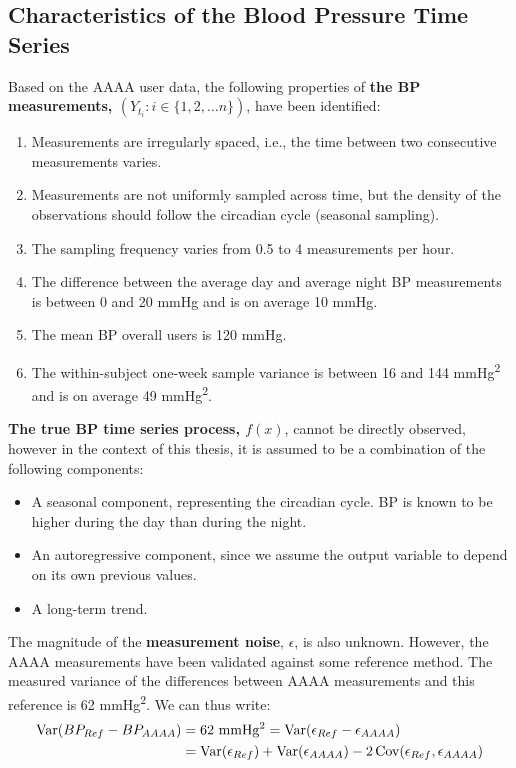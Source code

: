 \subsection{Characteristics of the Blood Pressure Time Series}\label{sec:characteristics-of-the-blood-pressure-time-series}

Based on the AAAA user data, the following properties of \textbf{the BP
measurements, $(Y_{t_i}: i \in \{1, 2, \dots n\})$}, have been identified:

\begin{enumerate}
    \item Measurements are irregularly spaced, i.e., the time between two
    consecutive measurements varies.
    \item Measurements are not uniformly sampled across time, but the density of
    the observations should follow the circadian cycle (seasonal sampling).
    \item The sampling frequency varies from 0.5 to 4 measurements per hour.
    \item The difference between the average day and average night BP measurements
    is between 0 and 20 mmHg and is on average 10 mmHg.
    \item The mean BP overall users is 120 mmHg.
    \item The within-subject one-week sample variance is between 16 and 144
    mmHg\textsuperscript{2} and is on average 49 mmHg\textsuperscript{2}.
\end{enumerate}


\textbf{The true BP time series process, $f(x)$}, cannot be directly observed,
however in the context of this thesis, it
is assumed to be a combination of the following components:

\begin{itemize}
    \item A seasonal component, representing the circadian cycle. BP is known to
    be higher during the day than during the night.
    \item An autoregressive component, since we assume the output variable to
    depend on its own previous values.
    \item A long-term trend.
\end{itemize}


The magnitude of the \textbf{measurement noise}, $\epsilon$, is also unknown.
However, the AAAA measurements have been validated against some
reference method.
The measured variance of the differences between AAAA measurements
and this reference is 62 mmHg\textsuperscript{2}.
We can thus write:
\begin{align*}
    \operatorname{Var}(BP_{Ref} - BP_{AAAA})
    & = \text{62 mmHg\textsuperscript{2}} = \operatorname{Var}(\epsilon_{Ref} - \epsilon_{AAAA}) \\
    & = \operatorname{Var}(\epsilon_{Ref}) + \operatorname{Var}(\epsilon_{AAAA}) - 2\operatorname{Cov}(\epsilon_{Ref},
    \epsilon_{AAAA})
\end{align*}

